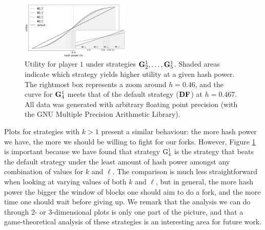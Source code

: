 \begin{figure}
  \centering
    \includegraphics[width=0.46\textwidth]{plots/GUP.png}
    \caption{Utility for player $1$ under strategies ${\rm {\bf G}}^1_2, \dots, {\rm {\bf G}}^1_5$. Shaded areas indicate which strategy yields higher utility at a given hash power. 
    The rightmost box represents a zoom around $h = 0.46$,
    and the curve for ${\rm {\bf G}}^1_4$ meets that of the default strategy ($\text{\rm {\bf DF}}$) at $h = 0.467$. All data was generated with arbitrary floating point precision (with the GNU Multiple Precision Arithmetic Library).\label{fig-plot-gup-fixwindow}}
\end{figure}

Plots for strategies with $k > 1$ present a similar behaviour: the more hash power we have, the more we should be willing to fight for our forks. However, 
Figure \ref{fig-plot-gup-fixwindow} is important because we have found that strategy ${\rm {G}}^1_4$ is the strategy that beats the default strategy under the least amount of hash power 
amongst any combination of values for $k$ and $\ell$. The comparison is much less straightforward when looking at varying values of both $k$ and $\ell$, but in general, 
the more hash power the bigger the window of blocks one should aim to do a fork, and the more time one should wait before giving up. We remark that the analysis 
we can do through 2- or 3-dimensional plots is only one part of the picture, and that a game-theoretical analysis of these strategies is an interesting area for future work. 



